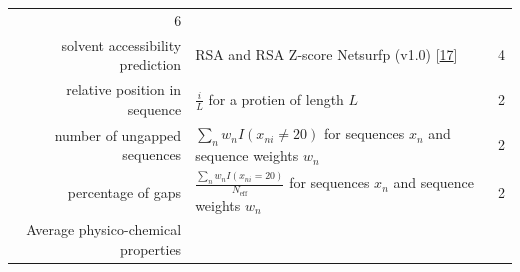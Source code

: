 \documentclass[12pt,a4paper,twoside]{book}
\theoremstyle{definition}
\theoremstyle{definition}
\theoremstyle{remark}
\begin{document}
\begin{longtable}[]{@{}rlc@{}}
\begin{minipage}[t]{0.18\columnwidth}
6\strut
\end{minipage}\tabularnewline
\begin{minipage}[t]{0.23\columnwidth}\raggedleft\strut
solvent accessibility prediction\strut
\end{minipage} & \begin{minipage}[t]{0.50\columnwidth}\raggedright\strut
RSA and RSA Z-score Netsurfp (v1.0)
{[}\protect\hyperlink{ref-Petersen2009a}{17}{]}\strut
\end{minipage} & \begin{minipage}[t]{0.18\columnwidth}\centering\strut
4\strut
\end{minipage}\tabularnewline
\begin{minipage}[t]{0.23\columnwidth}\raggedleft\strut
relative position in sequence\strut
\end{minipage} & \begin{minipage}[t]{0.50\columnwidth}\raggedright\strut
\(\frac{i}{L}\) for a protien of length \(L\)\strut
\end{minipage} & \begin{minipage}[t]{0.18\columnwidth}\centering\strut
2\strut
\end{minipage}\tabularnewline
\begin{minipage}[t]{0.23\columnwidth}\raggedleft\strut
number of ungapped sequences\strut
\end{minipage} & \begin{minipage}[t]{0.50\columnwidth}\raggedright\strut
\(\sum_n w_n I(x_{ni} \neq 20)\) for sequences \(x_n\) and sequence
weights \(w_n\)\strut
\end{minipage} & \begin{minipage}[t]{0.18\columnwidth}\centering\strut
2\strut
\end{minipage}\tabularnewline
\begin{minipage}[t]{0.23\columnwidth}\raggedleft\strut
percentage of gaps\strut
\end{minipage} & \begin{minipage}[t]{0.50\columnwidth}\raggedright\strut
\(\frac{\sum_n w_n I(x_{ni} = 20)}{N_{\text{eff}}}\) for sequences
\(x_n\) and sequence weights \(w_n\)\strut
\end{minipage} & \begin{minipage}[t]{0.18\columnwidth}\centering\strut
2\strut
\end{minipage}\tabularnewline
\begin{minipage}[t]{0.23\columnwidth}\raggedleft\strut
Average physico-chemical properties\strut

\end{minipage}
\end{longtable}
\end{document}
